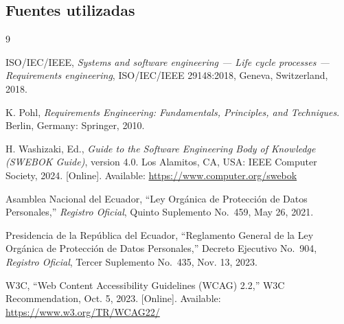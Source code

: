 \documentclass[11pt,a4paper]{article}
\begin{document}
\subsection{Fuentes utilizadas}

\begin{thebibliography}{9}

ISO/IEC/IEEE, \emph{Systems and software engineering --- Life cycle
processes --- Requirements engineering}, ISO/IEC/IEEE 29148:2018,
Geneva, Switzerland, 2018.

K. Pohl, \emph{Requirements Engineering: Fundamentals, Principles,
and Techniques}. Berlin, Germany: Springer, 2010.

H. Washizaki, Ed., \emph{Guide to the Software Engineering Body of
Knowledge (SWEBOK Guide)}, version 4.0. Los Alamitos, CA, USA:
IEEE Computer Society, 2024. [Online]. Available:
\url{https://www.computer.org/swebok}

Asamblea Nacional del Ecuador, ``Ley Orgánica de Protección de
Datos Personales,'' \emph{Registro Oficial}, Quinto Suplemento
No.~459, May 26, 2021.

Presidencia de la República del Ecuador, ``Reglamento General de la
Ley Orgánica de Protección de Datos Personales,'' Decreto Ejecutivo
No.~904, \emph{Registro Oficial}, Tercer Suplemento No.~435,
Nov. 13, 2023.

W3C, ``Web Content Accessibility Guidelines (WCAG) 2.2,'' W3C
Recommendation, Oct. 5, 2023. [Online]. Available:
\url{https://www.w3.org/TR/WCAG22/}

\end{thebibliography}
\end{document}
